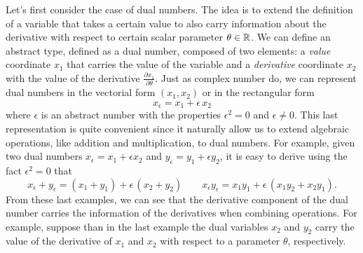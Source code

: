 Let's first consider the case of dual numbers.
The idea is to extend the definition of a variable that takes a certain value to also carry information about the derivative with respect to certain scalar parameter $\theta \in \operatorname{\mathbb{R}}$. 
We can define an abstract type, defined as a dual number, composed of two elements: a \textit{value} coordinate $x_1$ that carries the value of the variable and a \textit{derivative} coordinate $x_2$ with the value of the derivative $\frac{\partial x_1}{\partial \theta}$. 
Just as complex number do, we can represent dual numbers in the vectorial form $(x_1, x_2)$ or in the rectangular form 
\begin{equation}
 x_\epsilon = x_1 + \epsilon \, x_2
\end{equation}
where $\epsilon$ is an abstract number with the properties $\epsilon^2 = 0$ and $\epsilon \neq 0$.
This last representation is quite convenient since it naturally allow us to extend algebraic operations, like addition and multiplication, to dual numbers. 
For example, given two dual numbers $x_\epsilon = x_1 + \epsilon x_2$ and $y_\epsilon = y_1 + \epsilon y_2$, it is easy to derive using the fact $\epsilon^2=0$ that
\begin{equation}
 x_\epsilon + y_\epsilon = (x_1 + y_1) + \epsilon \, (x_2 + y_2)
 \qquad
 x_\epsilon y_\epsilon = x_1 y_1 + \epsilon \, (x_1 y_2 + x_2 y_1) .
\end{equation}
From these last examples, we can see that the derivative component of the dual number carries the information of the derivatives when combining operations.
For example, suppose than in the last example the dual variables $x_2$ and $y_2$ carry the value of the derivative of $x_1$ and $x_2$ with respect to a parameter $\theta$, respectively. 


